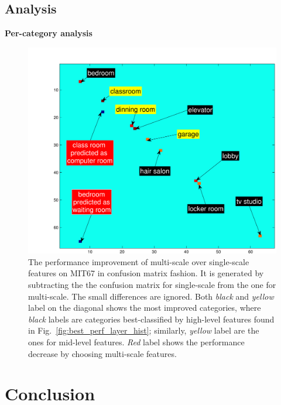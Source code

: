 \documentclass[10pt,twocolumn,letterpaper]{article}
\begin{document}
\subsection{Analysis}

{\bf Per-category analysis}


\begin{figure}[htbp]
\centering
	\includegraphics[width=\columnwidth]{fig/fig_conf_diff.pdf}
\caption{The performance improvement of multi-scale over single-scale features on MIT67 in confusion matrix fashion. It is generated by subtracting the the confusion matrix for single-scale from the one for multi-scale. The small differences are ignored. Both \textit{black} and \textit{yellow} label on the diagonal shows the most improved categories, where \textit{black} labels are categories best-classified by high-level features found in Fig.~\ref{fig:best_perf_layer_hist}; similarly, \textit{yellow} label are the ones for mid-level features. \textit{Red} label shows the performance decrease by choosing multi-scale features.}

\label{fig:conf_diff}
\end{figure}


\section{Conclusion}




{\small


}
\end{document}
